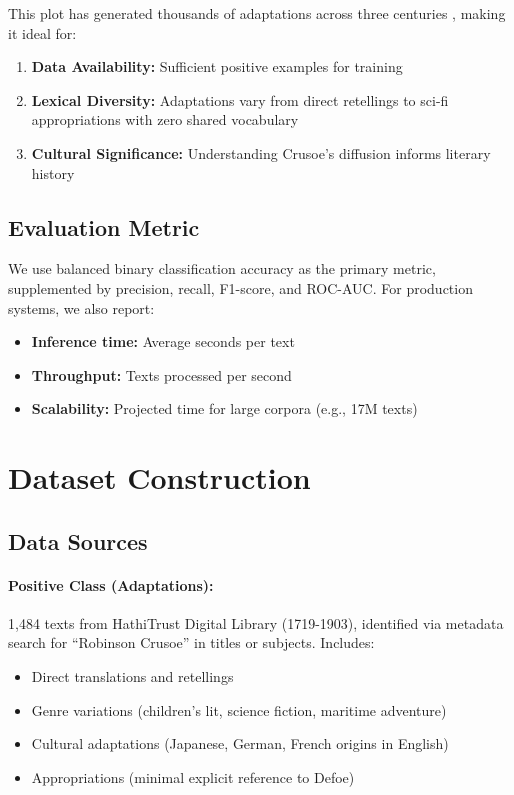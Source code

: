 \documentclass[11pt]{article}
\begin{document}
This plot has generated thousands of adaptations across three centuries \cite{Green1990RobinsonCrusoeStory}, making it ideal for:

\begin{enumerate}
    \item \textbf{Data Availability:} Sufficient positive examples for training
    \item \textbf{Lexical Diversity:} Adaptations vary from direct retellings to sci-fi appropriations with zero shared vocabulary
    \item \textbf{Cultural Significance:} Understanding Crusoe's diffusion informs literary history \cite{Watt2001RiseNovel}
\end{enumerate}

\subsection{Evaluation Metric}

We use balanced binary classification accuracy as the primary metric, supplemented by precision, recall, F1-score, and ROC-AUC. For production systems, we also report:

\begin{itemize}
    \item \textbf{Inference time:} Average seconds per text
    \item \textbf{Throughput:} Texts processed per second
    \item \textbf{Scalability:} Projected time for large corpora (e.g., 17M texts)
\end{itemize}

\section{Dataset Construction}

\subsection{Data Sources}

\paragraph{Positive Class (Adaptations):} 1,484 texts from HathiTrust Digital Library \cite{Christenson2011HathiTrust} (1719-1903), identified via metadata search for ``Robinson Crusoe'' in titles or subjects. Includes:

\begin{itemize}
    \item Direct translations and retellings
    \item Genre variations (children's lit, science fiction, maritime adventure)
    \item Cultural adaptations (Japanese, German, French origins in English)
    \item Appropriations (minimal explicit reference to Defoe)
\end{itemize}
\end{document}
